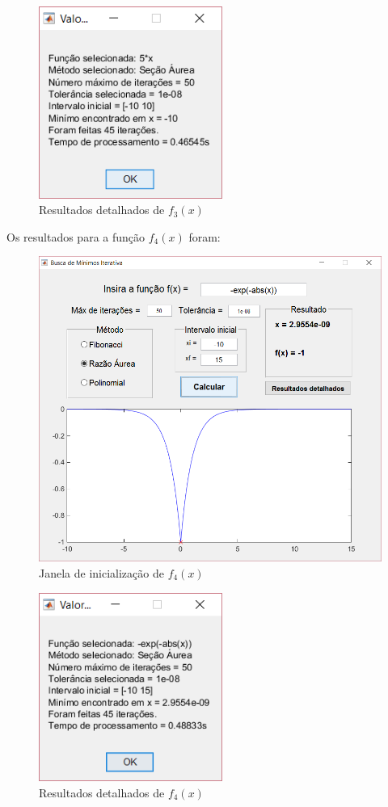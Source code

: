 \begin{figure}[h!]
	\begin{center}
		\includegraphics[width=6cm]{../aurea/f3_resultados.png}   
		\caption{Resultados detalhados de $ f_3(x) $}
		\label{fig:f3_resultados}
	\end{center}
\end{figure}

Os resultados para a função $ f_4(x) $ foram:

\begin{figure}[h]
	\begin{center}
		\includegraphics[width=14cm]{../aurea/f4_gui.png}   
		\caption{Janela de inicialização de $ f_4(x) $}
		\label{fig:f4_gui}
	\end{center}
\end{figure}

\begin{figure}[h!]
	\begin{center}
		\includegraphics[width=6cm]{../aurea/f4_resultados.png}   
		\caption{Resultados detalhados de $ f_4(x) $}
		\label{fig:f4_resultados}
	\end{center}
\end{figure}
